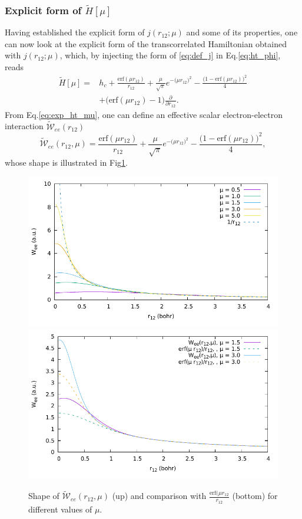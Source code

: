 \documentclass[aip,jcp,reprint,noshowkeys,superscriptaddress]{revtex4-1}
\newcommand{\deriv}[3]{\frac{\partial^{#3} #1}{\partial {#2}^{#3}}}
\begin{document}
\subsubsection{Explicit form of $\tilde{H}[\mu]$ }
Having established the explicit form of $j(r_{12};\mu)$ and some of its properties, one can now 
look at the explicit form of the transcorrelated Hamiltonian obtained with $j(r_{12};\mu)$,  
which, by injecting the form of \eqref{eq:def_j} in Eq.\eqref{eq:ht_phi}, reads 
\begin{equation}
  \begin{aligned}
 \label{eq:exp_ht_mu}
   \tilde{H}[\mu] = & h_c + \frac{\text{erf}(\mu r_{12})}{r_{12}} + \frac{\mu}{\sqrt{\pi}} e^{-\big(\mu r_{12} \big)^2} - \frac{\bigg(1 -     \text{erf}(\mu r_{12}) \bigg)^2}{4} \\
& + \bigg( \text{erf}(\mu r_{12}) - 1\bigg) \deriv{}{r_{12}}{}.
  \end{aligned}
\end{equation}
From Eq.\eqref{eq:exp_ht_mu}, one can define an effective scalar electron-electron interaction $\tilde{\mathcal{W}}_{ee}(r_{12}) $ 
\begin{equation}
 \label{eq:deff_w_new}
 \tilde{\mathcal{W}}_{ee}(r_{12},\mu) = \frac{\text{erf}(\mu r_{12})}{r_{12}} + \frac{\mu}{\sqrt{\pi}} e^{-\big(\mu r_{12} \big)^2} - \frac{\bigg(1 -     \text{erf}(\mu r_{12}) \bigg)^2}{4},
\end{equation}
whose shape is illustrated in Fig\ref{fig_wee_mu}. 
\begin{figure}
 \label{fig_wee_mu}
        \includegraphics[width=0.45\linewidth]{w_ee.pdf}
        \includegraphics[width=0.45\linewidth]{w_ee_bis.pdf}\\
        \caption{Shape of $\tilde{\mathcal{W}}_{ee}(r_{12},\mu)$ (up) and comparison with $\frac{\text{erf}(\mu r_{12}}{r_{12}}$ (bottom) for different values of $\mu$.}
\end{figure}
\end{document}
